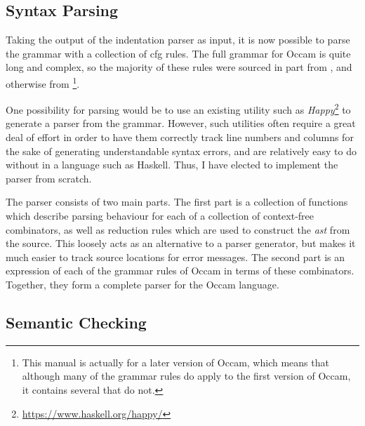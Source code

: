 \subsection{Syntax Parsing} \label{design-parser}

Taking the output of the indentation parser as input, it is now possible to
parse the grammar with a collection of \gls{cfg} rules. The full grammar for
Occam is quite long and complex, so the majority of these rules were sourced in
part from \cite[p.~124]{jones}, and otherwise from
\cite[p.~106]{occ21}\footnote{This manual is actually for a later version of
Occam, which means that although many of the grammar rules do apply to the first
version of Occam, it contains several that do not.}.

One possibility for parsing would be to use an existing utility such as
\textit{Happy}\footnote{\url{https://www.haskell.org/happy/}} to generate a
parser from the grammar. However, such utilities often require a great deal of
effort in order to have them correctly track line numbers and columns for the
sake of generating understandable syntax errors, and are relatively easy to do
without in a language such as Haskell. Thus, I have elected to implement the
parser from scratch.

The parser consists of two main parts. The first part is a collection of
functions which describe parsing behaviour for each of a collection of
context-free combinators, as well as reduction rules which are used to construct
the \textit{\gls{ast}} from the source. This loosely acts as an alternative to a
parser generator, but makes it much easier to track source locations for error
messages. The second part is an expression of each of the grammar rules of Occam
in terms of these combinators. Together, they form a complete parser for the
Occam language.

\subsection{Semantic Checking}

